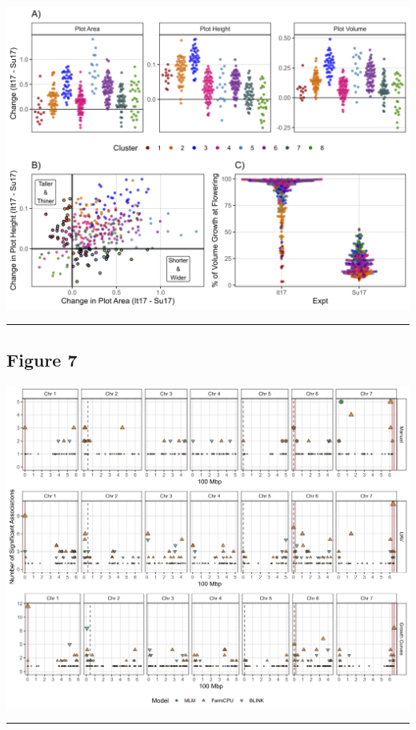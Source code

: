 \documentclass[
]{article}
\begin{document}
\includegraphics{Figure_06.png}

\begin{center}\rule{0.5\linewidth}{0.5pt}\end{center}

\subsection{Figure 7}\label{figure-7}

\includegraphics{Figure_07.png}

\begin{center}\rule{0.5\linewidth}{0.5pt}\end{center}
\end{document}
